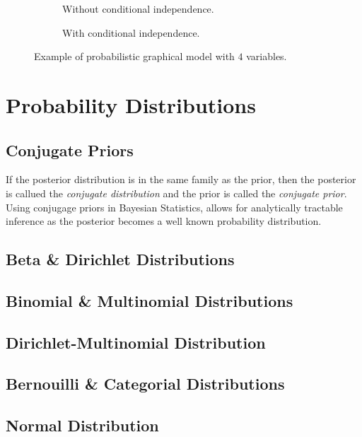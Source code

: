 \begin{figure}[h]
\centering
\begin{subfigure}{.49\textwidth}
\centering
{}
\caption{Without conditional independence.}
\end{subfigure}
\begin{subfigure}{.49\textwidth}
\centering
{}
\caption{With conditional independence.}
\end{subfigure}
\caption{Example of probabilistic graphical model with $4$ variables.}
\end{figure}

\section{Probability Distributions}
\subsection{Conjugate Priors}\label{sec:theory_conjugate_priors}
If the posterior distribution is in the same family as the prior, then the posterior is callued the \textit{conjugate distribution} and the prior is called the \textit{conjugate prior}. Using conjugage priors in Bayesian Statistics, allows for analytically tractable inference as the posterior becomes a well known probability distribution.

\subsection{Beta \& Dirichlet Distributions}
\subsection{Binomial \& Multinomial Distributions}
\subsection{Dirichlet-Multinomial Distribution}
\subsection{Bernouilli \& Categorial Distributions}
\subsection{Normal Distribution}
